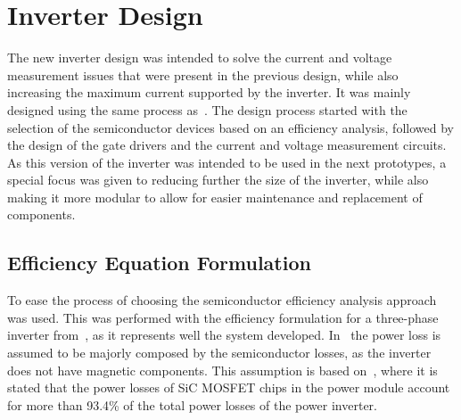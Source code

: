 \chapter{Inverter Design}
\label{chapter:appendix_inverter}

The new inverter design was intended to solve the current and voltage measurement issues that were present in the previous design, while also increasing the maximum current supported by the inverter. It was mainly designed using the same process as~\cite{Costa:MSc}. The design process started with the selection of the semiconductor devices based on an efficiency analysis, followed by the design of the gate drivers and the current and voltage measurement circuits. As this version of the inverter was intended to be used in the next prototypes, a special focus was given to reducing further the size of the inverter, while also making it more modular to allow for easier maintenance and replacement of components.

\section{Efficiency Equation Formulation}

To ease the process of choosing the semiconductor efficiency analysis approach was used. This was performed with the efficiency formulation for a three-phase inverter from~\cite{Costa:SiC_MOSFET_losses:2023}, as it represents well the system developed. In~\cite{Costa:SiC_MOSFET_losses:2023} the power loss is assumed to be majorly composed by the semiconductor losses, as the inverter does not have magnetic components. This assumption is based on~\cite{Song:SiC_MOSFET_losses:2019}, where it is stated that the power losses of SiC MOSFET chips in the power module account for more than 93.4\% of the total power losses of the power inverter.

